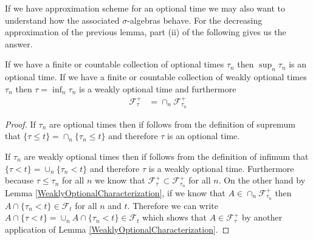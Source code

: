 If we have approximation scheme for an optional time we may also want
to understand how the associated $\sigma$-algebras behave.  For the
decreasing approximation of the previous lemma, part (ii) of the
following gives us the answer.
\begin{lem}\label{InfSupStoppedFiltration}If we have a finite or countable collection of optional
  times $\tau_n$ then $\sup_n \tau_n$ is an optional time.  If we have
  a finite or countable collection of weakly optional times $\tau_n$
  then $\tau = \inf_n \tau_n$ is a weakly optional time and
  furthermore
\begin{align*}
\mathcal{F}^+_\tau &= \cap_n \mathcal{F}^+_{\tau_n}
\end{align*}
\end{lem}
\begin{proof}
If $\tau_n$ are optional times then if follows from the definition of
supremum that $\lbrace \tau \leq t \rbrace = \cap_n \lbrace \tau_n
\leq t \rbrace$ and therefore $\tau$ is an optional time.

If $\tau_n$ are weakly optional times then if follows from the definition of
infimum that $\lbrace \tau < t \rbrace = \cup_n \lbrace \tau_n
< t \rbrace$ and therefore $\tau$ is a weakly optional time.
Furthermore because $\tau \leq \tau_n$ for all $n$ we know that
$\mathcal{F}^+_\tau \subset \mathcal{F}^+_{\tau_n}$ for all $n$.  On
the other hand by Lemma \ref{WeaklyOptionalCharacterization}, if we know that $A \in \cap_n \mathcal{F}^+_{\tau_n}$
then $A \cap \lbrace \tau_n < t \rbrace \in \mathcal{F}_t$ for all $n$
and $t$.  Therefore we can write $A \cap \lbrace \tau < t \rbrace =  \cup_n A \cap \lbrace \tau_n
< t \rbrace \in \mathcal{F}_t$ which shows that $A \in
\mathcal{F}^+_\tau$ by another application of Lemma \ref{WeaklyOptionalCharacterization}.
\end{proof}

